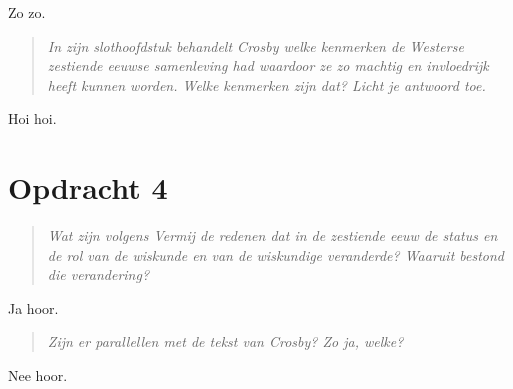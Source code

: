 \documentclass[a4paper,11pt]{article}
\begin{document}
Zo zo.


\begin{quote}
\emph{In zijn slothoofdstuk behandelt Crosby welke kenmerken de Westerse
  zestiende eeuwse samenleving had waardoor ze zo machtig en invloedrijk heeft
  kunnen worden. Welke kenmerken zijn dat? Licht je antwoord toe.}
\end{quote}

Hoi hoi.


\section*{Opdracht 4}


\begin{quote}
\emph{Wat zijn volgens Vermij de redenen dat in de zestiende eeuw de status en
  de rol van de wiskunde en van de wiskundige veranderde? Waaruit bestond die
  verandering?}
\end{quote}


Ja hoor.


\begin{quote}
\emph{Zijn er parallellen met de tekst van Crosby? Zo ja, welke?}
\end{quote}


Nee hoor.
\end{document}
